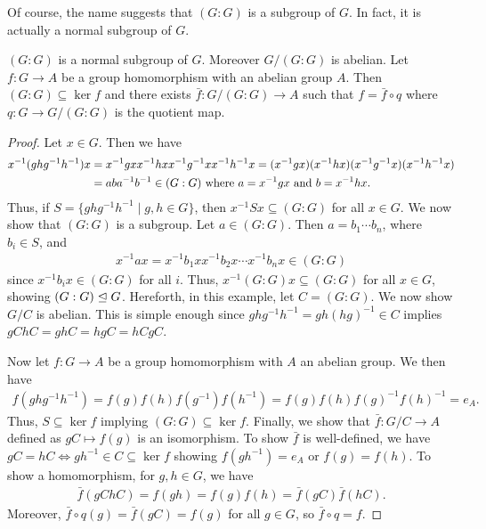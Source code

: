 \noindent Of course, the name suggests that $(G:G)$ is a subgroup of $G$. In fact, it is actually a normal subgroup of $G$.

\begin{proposition}
    $(G:G)$ is a normal subgroup of $G$. Moreover $G/(G:G)$ is abelian. Let $f:G \to A$ be a group homomorphism with an abelian group $A$. Then $(G:G) \subseteq \ker f$ and there exists $\bar{f}:G/(G:G) \to A$ such that $f = \bar{f} \circ q$ where $q:G \to G/(G:G)$ is the quotient map.
\end{proposition}

\begin{proof}
    Let $x \in G$. Then we have
    \begin{align}
        x^{-1}(ghg^{-1}h^{-1})x &= x^{-1}gxx^{-1}hxx^{-1}g^{-1}xx^{-1}h^{-1}x = (x^{-1}gx)(x^{-1}hx)(x^{-1}g^{-1}x)(x^{-1}h^{-1}x) \notag \\
        &= aba^{-1}b^{-1} \in (G:G) \text{ where } a = x^{-1}gx \text{ and } b = x^{-1}hx.
    \end{align}
    Thus, if $S = \{ghg^{-1}h^{-1} \mid g,h \in G\}$, then $x^{-1}Sx \subseteq (G:G)$ for all $x \in G$. We now show that $(G:G)$ is a subgroup. Let $a \in (G:G)$. Then $a = b_{1} \cdots b_{n}$, where $b_{i} \in S$, and
    \begin{align}
        x^{-1}ax = x^{-1}b_{1}xx^{-1}b_{2}x \cdots x^{-1}b_{n}x \in (G:G)
    \end{align}
    since $x^{-1}b_{i}x \in (G:G)$ for all $i$. Thus, $x^{-1}(G:G)x \subseteq (G:G)$ for all $x \in G$, showing $(G:G) \trianglelefteq G$. Hereforth, in this example, let $C = (G:G)$. We now show $G/C$ is abelian. This is simple enough since $ghg^{-1}h^{-1} = gh(hg)^{-1} \in C$ implies $gChC = ghC = hgC = hCgC$.

    Now let $f:G \to A$ be a group homomorphism with $A$ an abelian group. We then have
    \begin{align}
        f(ghg^{-1}h^{-1}) = f(g)f(h)f(g^{-1})f(h^{-1}) = f(g)f(h)f(g)^{-1}f(h)^{-1} = e_{A}.
    \end{align}
    Thus, $S \subseteq \ker f$ implying $(G:G) \subseteq \ker f$. Finally, we show that $\bar{f}:G/C \to A$ defined as $gC \mapsto f(g)$ is an isomorphism. To show $\bar{f}$ is well-defined, we have $gC = hC \Leftrightarrow gh^{-1} \in C \subseteq \ker f$ showing $f(gh^{-1}) = e_{A}$ or $f(g) = f(h)$. To show a homomorphism, for $g,h \in G$, we have
    \begin{align}
        \bar{f}(gChC) = f(gh) = f(g)f(h) = \bar{f}(gC)\bar{f}(hC).
    \end{align}
    Moreover, $\bar{f} \circ q(g) = \bar{f}(gC) = f(g)$ for all $g \in G$, so $\bar{f} \circ q = f$.
\end{proof}

